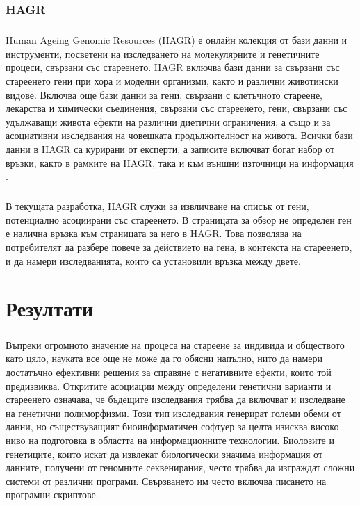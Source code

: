 \documentclass[pdftex,cyrillic,14pt,a4page,twoside,openright]{extreport}
\begin{document}
\subsection{HAGR}
\paragraph{}
Human Ageing Genomic Resources (HAGR) е онлайн колекция от бази данни и инструменти, посветени на изследването на молекулярните и генетичните процеси, свързани със стареенето. HAGR включва бази данни за свързани със стареенето гени при хора и моделни организми, както и различни животински видове. Включва още бази данни за гени, свързани с клетъчното стареене, лекарства и химически съединения, свързани със стареенето, гени, свързани със удължаващи живота ефекти на различни диетични ограничения, а също и за асоциативни изследвания на човешката продължителност на живота. Всички бази данни в HAGR са курирани от експерти, а записите включват богат набор от връзки, както в рамките на HAGR, така и към външни източници на информация \cite{tacutu2018}.

\paragraph{}
В текущата разработка, HAGR служи за извличване на списък от гени, потенциално асоциирани със стареенето. В страницата за обзор не определен ген е налична връзка към страницата за него в HAGR. Това позволява на потребителят да разбере повече за действието на гена, в контекста на стареенето, и да намери изследванията, които са установили връзка между двете.

\chapter{Резултати}
\paragraph{}
Въпреки огромното значение на процеса на стареене за индивида и обществото като цяло, науката все още не може да го обясни напълно, нито да намери достатъчно ефективни решения за справяне с негативните ефекти, които той предизвиква. Откритите асоциации между определени генетични варианти и стареенето означава, че бъдещите изследвания трябва да включват и изследване на генетични полиморфизми. Този тип изследвания генерират големи обеми от данни, но съществуващият биоинформатичен софтуер за целта изисква високо ниво на подготовка в областта на информационните технологии. Биолозите и генетиците, които искат да извлекат биологически значима информация от данните, получени от геномните секвенирания, често трябва да изграждат сложни системи от различни програми. Свързването им често включва писането на програмни скриптове.
\end{document}
